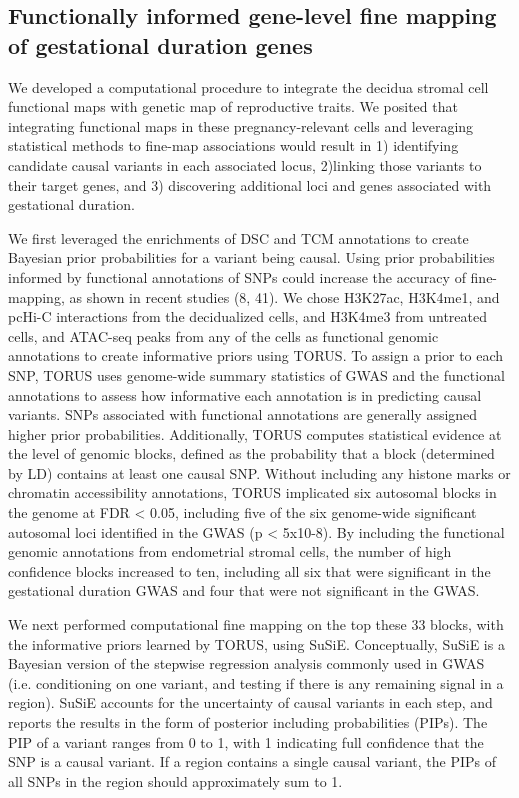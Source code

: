 \subsection{Functionally informed gene-level fine mapping of gestational duration genes}

We developed a computational procedure to integrate the decidua stromal cell functional maps with genetic map of reproductive traits.
We posited that integrating functional maps in these pregnancy-relevant cells and leveraging statistical methods to fine-map associations
would result in 1) identifying candidate causal variants in each associated locus, 2)linking those variants to their target genes, and 3) discovering additional loci and genes associated with gestational duration. 

We first leveraged the enrichments of DSC and TCM annotations to create Bayesian prior probabilities for a variant being causal.
Using prior probabilities informed by functional annotations of SNPs could increase the accuracy of fine-mapping, as shown in recent studies (8, 41).
We chose H3K27ac, H3K4me1, and pcHi-C interactions from the decidualized cells, and H3K4me3 from untreated cells, and ATAC-seq peaks from any of the
cells as functional genomic annotations to create informative priors using TORUS\cite{torus}. To assign a prior to each SNP, TORUS uses genome-wide
summary statistics of GWAS and the functional annotations to assess how informative each annotation is in predicting causal variants. SNPs associated
with functional annotations are generally assigned higher prior probabilities. Additionally, TORUS computes statistical evidence at the level of
genomic blocks, defined as the probability that a block (determined by LD) contains at least one causal SNP. Without including any histone marks
or chromatin accessibility annotations, TORUS implicated six autosomal blocks in the genome at FDR < 0.05, including five of the six genome-wide
significant autosomal loci identified in the GWAS (p < 5x10-8).
By including the functional genomic annotations from endometrial stromal cells, the number of high confidence blocks increased to ten, including all
six that were significant in the gestational duration GWAS and four that were not significant in the GWAS.  

We next performed computational fine mapping on the top these 33 blocks, with the informative priors learned by TORUS, using SuSiE\cite{susie}. Conceptually, SuSiE
is a Bayesian version of the stepwise regression analysis commonly used in GWAS (i.e. conditioning on one variant, and testing if there is any remaining signal in a region).
SuSiE accounts for the uncertainty of causal variants in each step, and reports the results in the form of posterior including probabilities (PIPs). The PIP of a variant ranges
from 0 to 1, with 1 indicating full confidence that the SNP is a causal variant. If a region contains a single causal variant, the PIPs of all SNPs in the region should approximately sum to 1.  

